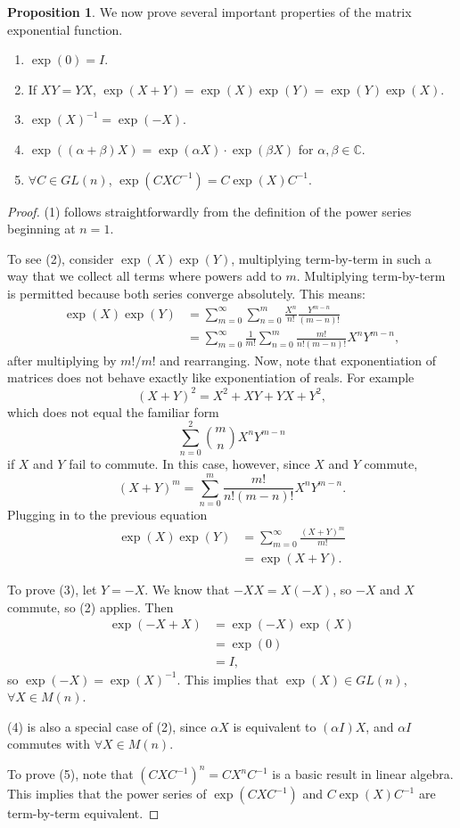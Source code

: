 \documentclass[12pt]{article}
\newcommand{\C}{\mathbb{C}}
\theoremstyle{definition}
\newtheorem{prop}[them]{Proposition}
\theoremstyle{definition}
\theoremstyle{definition}
\theoremstyle{definition}
\theoremstyle{definition}
\theoremstyle{definition}
\theoremstyle{definition}
\theoremstyle{definition}
\begin{document}
\begin{prop}\label{prop:expprop} We now prove several important properties of the
matrix exponential function.
\begin{enumerate}
    \item $\exp(0)= I$.
    \item If $XY = YX$, $\exp(X + Y) = \exp(X)\exp(Y) = \exp(Y)\exp(X)$.
    \item ${\exp(X)}^{-1} = {\exp(-X)}$.
    \item $\exp((\alpha +\beta)X) = \exp(\alpha X)
    \cdot \exp(\beta X)$ for $\alpha, \beta \in
    \C$. 
    \item $\forall C \in GL(n)$, $\exp(CXC^{-1}) = C\exp(X)C^{-1}$.
\end{enumerate}
\end{prop}

\begin{proof}
\par{(1) follows straightforwardly from the definition
of the power series beginning at $n=1$.} \par{To
see (2), consider $\exp(X)\exp(Y)$, multiplying
term-by-term in
such a way that we collect all terms where powers
add to $m$. Multiplying term-by-term is permitted
because both series converge absolutely. This means:
\[
\begin{aligned}
\exp(X) \exp(Y) & = \sum_{m=0}^{\infty}\sum_{n=0}^{m}\frac{X^n}{n!} \frac{Y^{m-n}}{(m-n)!}  \\
& = \sum_{m=0}^{\infty}\frac{1}{m!}\sum_{n=0}^{m}\frac{m!}{n!(m-n)!}X^{n}Y^{m-n},
\end{aligned}
\] after multiplying by $m!/m!$ and rearranging. Now, note that exponentiation of matrices does not behave exactly like exponentiation of reals. For example 
\[{(X+Y)}^2 = X^2 + XY + YX + Y^2,\] which does
not equal the familiar form
\[\sum_{n=0}^2 \binom{m}{n}X^n Y^{m-n}\] if $X$
and $Y$ fail to commute. In this case, however,
since $X$ and $Y$ commute,
\[
    {(X+Y)}^m = \sum_{n=0}^{m} \frac{m!}{n!(m-n)!}X^{n} Y^{m-n}.
\] Plugging in to the previous equation
\[\begin{aligned}
    \exp(X)\exp(Y) & = \sum_{m=0}^{\infty}\frac{{(X+Y)}^{m}}{m!} \\ & = \exp(X+Y).
\end{aligned}\]
}
\par{To prove (3), let $Y = -X$. We know that
$-XX = X(-X)$, so $-X$ and $X$ commute, so (2)
applies. Then 
\[\begin{aligned}\exp(-X + X) & = \exp(-X) \exp(X)
\\ & = \exp(0) \\ & = I,\end{aligned}\] 
so $\exp(-X) = {\exp(X)}^{-1}$. This implies that
$\exp(X) \in GL(n)$, $\forall X \in M(n)$.}
\par{(4) is also a special case of (2), since
$\alpha X$ is equivalent to $(\alpha I)X$, and
$\alpha I$ commutes with $\forall X \in M(n)$.}
\par{To prove (5), note that ${(CXC^{-1})}^n =
CX^n C^{-1}$ is a basic result in linear algebra.
This implies that the power series of
$\exp(CXC^{-1})$ and $C\exp(X)C^{-1}$ are
term-by-term equivalent.}
\end{proof}
\end{document}
